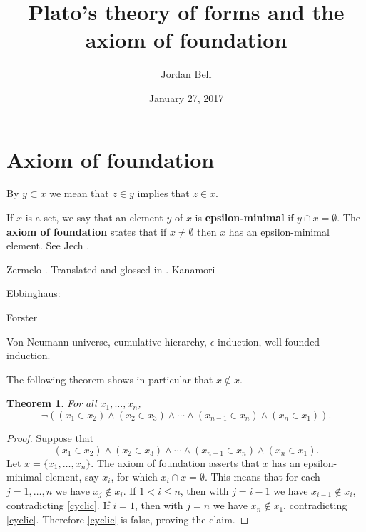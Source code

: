 \documentclass{article}
\newtheorem{theorem}{Theorem}
\theoremstyle{definition}
\begin{document}
\title{Plato's theory of forms and the axiom of foundation}
\author{Jordan Bell}

\date{January 27, 2017}

\maketitle


\section{Axiom of foundation}
By $y \subset x$ we mean that $z \in y$ implies that $z \in x$. 


If $x$ is a set, we say that an element $y$ of $x$ is \textbf{epsilon-minimal} if
$y \cap x = \emptyset$. 
The \textbf{axiom of foundation} states that if $x \neq \emptyset$ then $x$ has an epsilon-minimal element. 
See Jech  \cite[p.~63, Chapter 6]{jech}.

Zermelo \cite{zermelo1930}. Translated and glossed in \cite[pp.~1208--1233]{ewaldII}. Kanamori \cite{kanamori}

Ebbinghaus: \cite{ebbinghaus} 

Forster \cite{forster}

Von Neumann universe, cumulative hierarchy, $\epsilon$-induction, well-founded induction.

The following theorem shows in particular that $x \not \in x$. 


\begin{theorem}
For all  $x_1,\ldots,x_n$,
\[
\neg ((x_1 \in x_2) \wedge (x_2 \in x_3) \wedge \cdots \wedge (x_{n-1} \in x_n) \wedge (x_n \in x_1)).
\] 
\end{theorem}
\begin{proof}
Suppose that
\begin{equation}
(x_1 \in x_2) \wedge (x_2 \in x_3) \wedge \cdots \wedge (x_{n-1} \in x_n) \wedge (x_n \in  x_1).
\label{cyclic}
\end{equation}
Let $x=\{x_1,\ldots,x_n\}$. The axiom of foundation asserts that $x$ has an epsilon-minimal element, say $x_i$, for which
$x_i \cap x = \emptyset$. This means that for each $j=1,\ldots,n$ we have $x_j \not \in x_i$. If $1<i \leq n$, then with
$j=i-1$ we have $x_{i-1} \not \in x_i$, contradicting \eqref{cyclic}. If $i=1$, then with $j=n$ we have $x_n \not \in x_1$, contradicting
\eqref{cyclic}. Therefore \eqref{cyclic} is false, proving the claim.
\end{proof}
\end{document}
